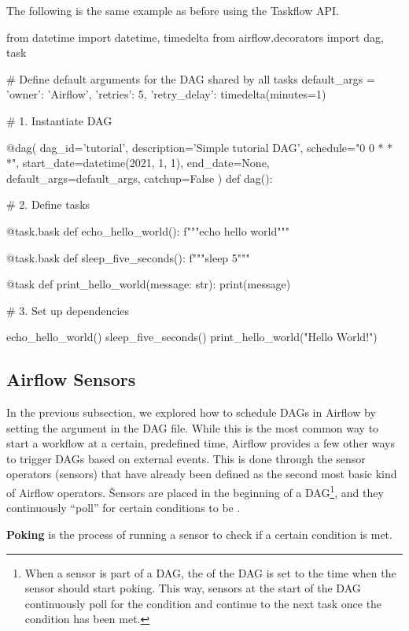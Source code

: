\be
The following is the same example as before using the Taskflow API\@.

\begin{block}
from datetime import datetime, timedelta
from airflow.decorators import dag, task

# Define default arguments for the DAG shared by all tasks
default_args = {
    'owner': 'Airflow',
    'retries': 5,
    'retry_delay': timedelta(minutes=1)
}

# 1. Instantiate DAG

@dag(
    dag_id='tutorial',
    description='Simple tutorial DAG',
    schedule="0 0 * * *",
    start_date=datetime(2021, 1, 1),
    end_date=None,
    default_args=default_args,
    catchup=False
)
def dag():

    # 2. Define tasks

    @task.bask
    def echo_hello_world():
        f"""echo hello world"""

    @task.bask
    def sleep_five_seconds():
        f"""sleep 5"""

    @task
    def print_hello_world(message: str):
        print(message)

    # 3. Set up dependencies

    echo_hello_world()
    sleep_five_seconds()
    print_hello_world("Hello World!")
\end{block}
\ee

\subsection{Airflow Sensors}

In the previous subsection, we explored how to schedule DAGs in Airflow by setting the  argument in
the DAG file. While this is the most common way to start a workflow at a certain, predefined time, Airflow provides
a few other ways to trigger DAGs based on external events. This is done through the sensor operators (sensors) that
have already been defined as the second most basic kind of Airflow operators. \v

Sensors are placed in the beginning of a DAG\footnote{When a sensor is part of a DAG, the  of the DAG
is set to the time when the sensor should start poking. This way, sensors at the start of the DAG continuously poll for
the condition and continue to the next task once the condition has been met.}, and they continuously ``poll'' for
certain conditions to be .

\bd[Poking]
\textbf{Poking} is the process of running a sensor to check if a certain condition is met.
\ed

